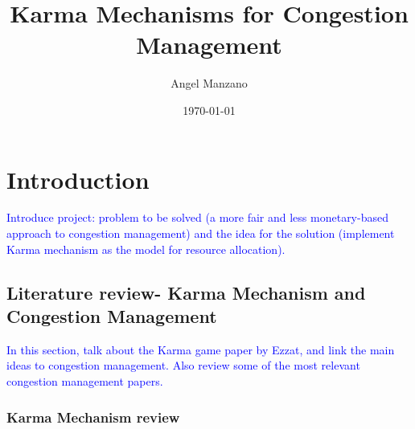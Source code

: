 \documentclass[a4paper,11pt,twoside]{book}
\title{Karma Mechanisms for Congestion Management}
\author{Angel Manzano}
\date{\today}
\begin{document}
\hyphenation{}

\maketitle



\cleardoublepage
\tableofcontents
\cleardoublepage
{}
\listoffigures
\cleardoublepage
{}
\listoftables					
\cleardoublepage
\mainmatter


\chapter{Introduction}

\textcolor{blue}{Introduce project: problem to be solved (a more fair and less monetary-based approach to congestion management) and the idea for the solution (implement Karma mechanism as the model for resource allocation).}

\section{Literature review- Karma Mechanism and Congestion Management}

\textcolor{blue}{In this section, talk about the Karma game paper by Ezzat, and link the main ideas to congestion management. Also review some of the most relevant congestion management papers.}



\subsection{Karma Mechanism review}
\end{document}
